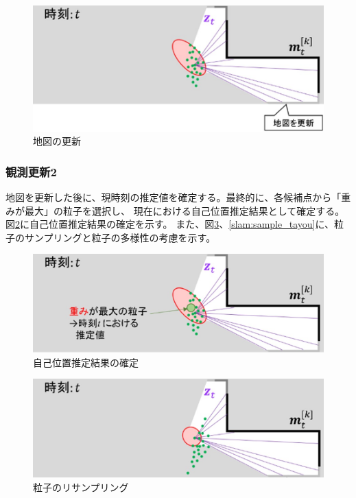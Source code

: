 \begin{figure}[h]
  \begin{center}
  \includegraphics[width=.8\linewidth]{img/slam_17.jpg}
  \caption{地図の更新}
  \label{slam:sample_chizu_koushin}
  \end{center}
\end{figure}

\subsubsection{観測更新2}
地図を更新した後に、現時刻の推定値を確定する。最終的に、各候補点から「重みが最大」の粒子を選択し、
現在における自己位置推定結果として確定する。図\ref{slam:sample_suitei_kakutei}に自己位置推定結果の確定を示す。
また、図\ref{slam:sample_resampling}、\ref{slam:sample_tayou}に、粒子のサンプリングと粒子の多様性の考慮を示す。

\begin{figure}[h]
  \begin{center}
  \includegraphics[width=.8\linewidth]{img/slam_18.jpg}
  \caption{自己位置推定結果の確定}
  \label{slam:sample_suitei_kakutei}
  \end{center}
\end{figure}

\begin{figure}[h]
  \begin{center}
  \includegraphics[width=.8\linewidth]{img/slam_19.jpg}
  \caption{粒子のリサンプリング}
  \label{slam:sample_resampling}
  \end{center}
\end{figure}


